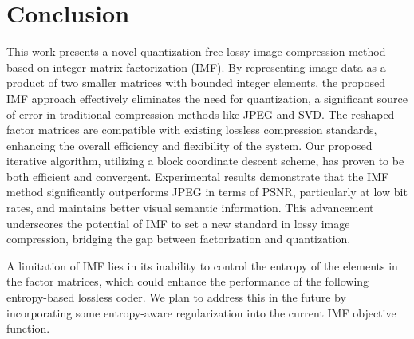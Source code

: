 \section{Conclusion} \label{sec: conclusion}

This work presents a novel quantization-free lossy image compression method based on integer matrix factorization (IMF). By representing image data as a product of two smaller matrices with bounded integer elements, the proposed IMF approach effectively eliminates the need for quantization, a significant source of error in traditional compression methods like JPEG and SVD. The reshaped factor matrices are compatible with existing lossless compression standards, enhancing the overall efficiency and flexibility of the system. Our proposed iterative algorithm, utilizing a block coordinate descent scheme, has proven to be both efficient and convergent. Experimental results demonstrate that the IMF method significantly outperforms JPEG in terms of PSNR, particularly at low bit rates, and maintains better visual semantic information. This advancement underscores the potential of IMF to set a new standard in lossy image compression, bridging the gap between factorization and quantization. 

A limitation of IMF lies in its inability to control the entropy of the elements in the factor matrices, which could enhance the performance of the following entropy-based lossless coder. We plan to address this in the future by incorporating some entropy-aware regularization into the current IMF objective function.
